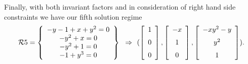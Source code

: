 \documentclass[10pt]{article}
\begin{document}
%
%
%
%
Finally, with both invariant factors and in consideration of right hand side constraints we 
have our fifth solution regime
\[\RR5 = 
\breg -y-1+x+{y}^{2}=0\\-{y}^{2}+x=0\\-{y}^{2}+1=0\\-1+{y}^{3}=0\ereg \implies
(\left [\begin {array}{c} 1\\\noalign{\medskip}0\\\noalign{\medskip}0
\end {array}\right ]
,%
\left [\begin {array}{c} -x\\\noalign{\medskip}1\\\noalign{\medskip}0
\end {array}\right ]
,%
\left [\begin {array}{c} -x{y}^{2}-y\\\noalign{\medskip}{y}^{2}\\\noalign{\medskip}
1\end {array}\right ]
).
\]
\end{document}
